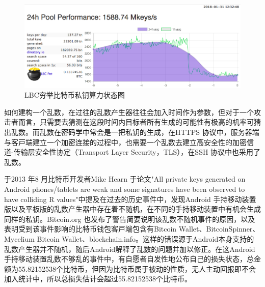 				\begin{figure}[!htb]
					\centering
					\includegraphics[width = .9\textwidth]{LBC.png}
					\caption{LBC穷举比特币私钥算力状态图\supercite{TheLargeBitcoinCollider}}\label{LBC}
				\end{figure}

				如何建构一个乱数，在过往的乱数产生器往往会加入时间作为参数，但对于一个攻击者而言，只需要去猜测在这段时间内目标者所有生成的可能性有极高的机率可猜出乱数。而乱数在密码学中常会是一把私钥的生成，在HTTPS 协议中，服务器端与客⼾端建⽴⼀个加密连接的过程中，也需要⼀个乱数去建⽴⾼安全性的加密信道-传输层安全性协定（Transport Layer Security，TLS）\supercite{dierks2008transport}，在SSH 协议\supercite{ThesecureshellSSHprotocolarchitecture}中也采用了乱数。
		
				于2013 年8 ⽉⽐特币开发者Mike Hearn 于论文"All private keys generated on Android phones/tablets are weak and some signatures have been observed to have colliding R values"\supercite{SomeSecureRandomThoughts}中提及在过去的历史事件中，发现Android 手持移动装置版以及平板版的乱数产生器中存在着不随机，在不同的手持移动装置中有机会生成同样的私钥。Bitcoin.org 也发布了警告\supercite{AndroidSecurityVulnerability}简要说明该乱数不随机事件的原因，以及表明受到该事件影响的⽐特币钱包客⼾端包含有Bitcoin Wallet、BitcoinSpinner、Mycelium Bitcoin Wallet、blockchain.info。这样的错误源于Android本身支持的乱数产生器并不随机，随后Android解释了乱数的问题并加以修正。在这Android手持移动装置乱数不够乱的事件中，有自愿者自发性地公布自己的损失状态，总金额为55.82152538个比特币\supercite{Badsignaturesleading}，但因为比特币属于被动的性质，无人主动回报即不会加入统计中，所以总损失估计会超过55.82152538个比特币。

